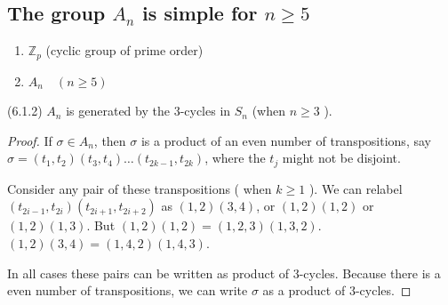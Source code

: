 \subsection{The group $A_n$ is simple for $n\ge 5$ }

\begin{example}
	\begin{enumerate}
		\item $\mathbb{Z}_p$ (cyclic group of prime order)
		\item $A_n \quad (n\ge 5)$
	\end{enumerate}
\end{example}

\begin{theorem}(6.1.2)
	$A_n$ is generated by the $3$-cycles in $S_n$ (when $n \ge 3$ ).
\end{theorem}
\begin{proof}
	If $\sigma \in A_n$, then $\sigma$ is a product of an even number of transpositions, say $\sigma = (t_1,t_2)(t_3,t_4)\ldots(t_{2k-1},t_{2k})$, where the $t_j$ might not be disjoint.

	Consider any pair of these transpositions ( when $k \ge 1$ ). 
	We can relabel $(t_{2i-1}, t_{2i })(t_{2i+1 },t_{2i+2})$ as $(1,2)(3,4)$, or  $(1,2)(1,2)$ or  $(1,2)(1,3)$.
	But  $(1,2)(1,2) = (1,2,3)(1,3,2)$. $(1,2)(3,4) = (1,4,2)(1,4,3)$.

	In all cases these pairs can be written as product of 3-cycles. Because there is a even number of transpositions, we can write $\sigma$ as a product of $3$-cycles.
\end{proof}

